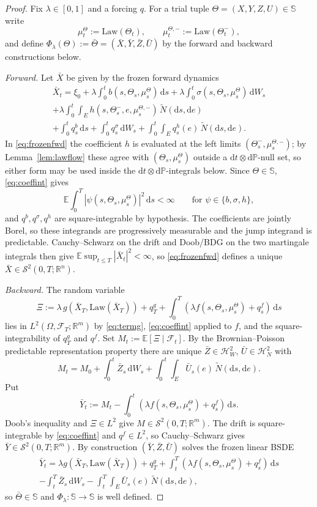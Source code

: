 \documentclass[preprint,12pt]{elsarticle}
\newcommand{\R}{\mathbb{R}}
\newcommand{\E}{\mathbb{E}}
\newcommand{\Prob}{\mathbb{P}}
\newcommand{\F}{\mathcal{F}}
\newcommand{\diff}{\mathrm{d}}
\newcommand{\Nt}{\widetilde{N}}
\newcommand{\Law}{\mathrm{Law}}
\newcommand{\HH}{\mathbb{S}}
\newcommand{\Ssp}[1]{\mathcal{S}^2(0,T;#1)}
\newcommand{\HW}{\mathcal{H}^2_W}
\newcommand{\HN}{\mathcal{H}^2_N}
\numberwithin{equation}{section}
\theoremstyle{plain}
\theoremstyle{definition}
\theoremstyle{\PaperRemarkStyle}
\begin{document}
\begin{proof}
Fix $\lambda\in[0,1]$ and a forcing $q$. For a trial tuple $\Theta=(X,Y,Z,U)\in\HH$ write
\[
\mu^\Theta_t:=\Law(\Theta_t),\qquad\mu^{\Theta,-}_t:=\Law(\Theta_t^-),
\]
and define $\Phi_\lambda(\Theta):=\bar\Theta=(\bar X,\bar Y,\bar Z,\bar U)$ by the forward and
backward constructions below.

\emph{Forward.} Let $\bar X$ be given by the frozen forward dynamics
\begin{multline}\label{eq:frozenfwd}
\bar X_t=\xi_0+\lambda\!\int_0^t b(s,\Theta_s,\mu^\Theta_s)\,\diff s
+\lambda\!\int_0^t\sigma(s,\Theta_s,\mu^\Theta_s)\,\diff W_s\\
+\lambda\!\int_0^t\!\!\int_E h(s,\Theta_s^-,e,\mu^{\Theta,-}_s)\,\Nt(\diff s,\diff e)\\
+\int_0^t q^b_s\,\diff s+\int_0^t q^\sigma_s\,\diff W_s+\int_0^t\!\!\int_E q^h_s(e)\,\Nt(\diff s,\diff e).
\end{multline}
In \eqref{eq:frozenfwd} the coefficient $h$ is evaluated at the left limits
$(\Theta^-_s,\mu^{\Theta,-}_s)$; by Lemma~\ref{lem:lawflow} these agree with
$(\Theta_s,\mu^\Theta_s)$ outside a $\diff t\otimes\diff\Prob$-null set, so either form may be
used inside the $\diff t\otimes\diff\Prob$-integrals below.
Since $\Theta\in\HH$, \eqref{eq:coeffint} gives
\[
\E\!\int_0^T\!|\psi(s,\Theta_s,\mu^\Theta_s)|^2\,\diff s<\infty
\qquad\text{for }\psi\in\{b,\sigma,h\},
\]
and $q^b,q^\sigma,q^h$ are square-integrable by hypothesis. The coefficients are jointly Borel,
so these integrands are progressively measurable and the jump integrand is predictable.
Cauchy--Schwarz on the drift and Doob/BDG on the two martingale integrals then give
$\E\sup_{t\le T}|\bar X_t|^2<\infty$, so \eqref{eq:frozenfwd} defines a unique
$\bar X\in\Ssp{\R^n}$.

\emph{Backward.} The random variable
\[
\Xi:=\lambda\,g(\bar X_T,\Law(\bar X_T))+q^g_T+\int_0^T(\lambda f(s,\Theta_s,\mu^\Theta_s)+q^f_s)\,\diff s
\]
lies in $L^2(\Omega,\F_T;\R^m)$ by \eqref{eq:termg}, \eqref{eq:coeffint} applied to $f$, and the
square-integrability of $q^g_T$ and $q^f$. Set $M_t:=\E[\Xi\mid\F_t]$. By the Brownian--Poisson
predictable representation property there are unique
$\bar Z\in\HW$, $\bar U\in\HN$ with
\[
M_t=M_0+\int_0^t\bar Z_s\,\diff W_s+\int_0^t\!\int_E\bar U_s(e)\,\Nt(\diff s,\diff e).
\]
Put
\[
\bar Y_t:=M_t-\int_0^t(\lambda f(s,\Theta_s,\mu^\Theta_s)+q^f_s)\,\diff s .
\]
Doob's inequality and $\Xi\in L^2$ give $M\in\Ssp{\R^m}$. The drift is square-integrable by
\eqref{eq:coeffint} and $q^f\in L^2$, so Cauchy--Schwarz gives $\bar Y\in\Ssp{\R^m}$. By construction
$(\bar Y,\bar Z,\bar U)$ solves the frozen linear BSDE
\begin{multline}\label{eq:frozenbwd}
\bar Y_t=\lambda g(\bar X_T,\Law(\bar X_T))+q^g_T
+\int_t^T\!(\lambda f(s,\Theta_s,\mu^\Theta_s)+q^f_s)\,\diff s\\
-\int_t^T\bar Z_s\,\diff W_s-\int_t^T\!\!\int_E\bar U_s(e)\,\Nt(\diff s,\diff e),
\end{multline}
so $\bar\Theta\in\HH$ and $\Phi_\lambda:\HH\to\HH$ is well defined.


\end{proof}
\end{document}
